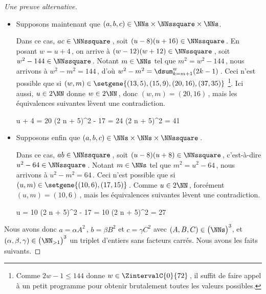 \begin{proof}[Une preuve alternative]
\begin{itemize}
		
		\medskip
		\item Supposons maintenant que $(a, b, c) \in \NNs \times \NNssquare \times \NNs$. 
		
		\smallskip
		\noindent
		Dans ce cas, $ac \in \NNssquare$\,, soit $(u - 8) (u + 16) \in \NNssquare$\,.
		En posant $w = u + 4$\,, on arrive à $(w - 12) (w + 12) \in \NNssquare$\,, soit $w^2 - 144 \in \NNssquare$\,.
		Notant $m \in \NNs$ tel que $m^2 = w^2 - 144$\,, nous arrivons à $w^2 - m^2 = 144$\,, d'où $w^2 - m^2 = \dsum_{k=m+1}^{w} (2 k - 1)$\,.
		Ceci n'est possible que si $(w, m) \in \setgene{(13, 5) , (15, 9) , (20, 16) , (37, 35)}$
		\footnote{
			Comme $2 w - 1 \leq 144$ donne $w \in \ZintervalC{0}{72}$\,, il suffit de faire appel à un petit programme pour obtenir brutalement toutes les valeurs possibles.
		}.
		Ici aussi, $u \in 2 \NN$ donne $w \in 2 \NN$\,, donc $(w, m) = (20, 16)$\,, mais les équivalences suivantes lèvent une contradiction.

		\medskip
		\noindent\!\!%
   		\begin{stepcalc}[style = sar, ope = \iff]
			u + 4 = 20
		\explnext{}
			(2 n + 5)^2 - 17 = 24
		\explnext*{$41 \notin \NNsquare$}{}
			(2 n + 5)^2 = 41
		\end{stepcalc}	
		
		
		\medskip
		\item Supposons enfin que $(a, b, c) \in \NNs \times \NNs \times \NNssquare$\,. 
		
		\smallskip
		\noindent
		Dans ce cas, $ab \in \NNssquare$\,, soit $(u - 8) (u + 8) \in \NNssquare$\,, c'est-à-dire $u^2 - 64 \in \NNssquare$\,.
		Notant $m \in \NNs$ tel que $m^2 = u^2 - 64$\,, nous arrivons à $u^2 - m^2 = 64$\,.
		Ceci n'est possible que si $(u, m) \in \setgene{(10, 6), (17, 15)}$\,.
		Comme $u \in 2 \NN$\,, forcément $(u, m) = (10, 6)$\,, mais les équivalences suivantes lèvent une contradiction.

		\medskip
		\noindent\!\!%
   		\begin{stepcalc}[style = sar, ope = \iff]
			u = 10
		\explnext{}
			(2 n + 5)^2 - 17 = 10
		\explnext*{$27 \notin \NNsquare$}{}
			(2 n + 5)^2 = 27
		\end{stepcalc}
	\end{itemize}


	Nous avons donc $a = \alpha A^2$\,, $b = \beta B^2$ et $c = \gamma C^2$ avec $(A, B, C) \in \big( \NNs \big)^3$, et $(\alpha, \beta, \gamma) \in \big( \NN_{>1} \big)^3$ un triplet d'entiers sans facteurs carrés.
	Nous avons les faits suivants.
    

\end{proof}
